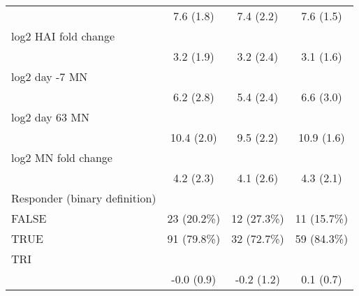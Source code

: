 \begin{table}[]
\begin{tabular}{ l c c c }
 \hspace{6pt}   & 7.6 (1.8) & 7.4 (2.2) & 7.6 (1.5)\\ 
 log2 HAI fold change  &   &   &  \\ 
 \hspace{6pt}   & 3.2 (1.9) & 3.2 (2.4) & 3.1 (1.6)\\ 
 log2 day -7 MN  &   &   &  \\ 
 \hspace{6pt}   & 6.2 (2.8) & 5.4 (2.4) & 6.6 (3.0)\\ 
 log2 day 63 MN  &   &   &  \\ 
 \hspace{6pt}   & 10.4 (2.0) & 9.5 (2.2) & 10.9 (1.6)\\ 
 log2 MN fold change  &   &   &  \\ 
 \hspace{6pt}   & 4.2 (2.3) & 4.1 (2.6) & 4.3 (2.1)\\ 
 Responder (binary definition) &   &   &  \\ 
 \hspace{6pt}    FALSE & 23 (20.2\%) & 12 (27.3\%) & 11 (15.7\%)\\ 
 \hspace{6pt}    TRUE & 91 (79.8\%) & 32 (72.7\%) & 59 (84.3\%)\\ 
 TRI &   &   &  \\ 
 \hspace{6pt}   & -0.0 (0.9) & -0.2 (1.2) & 0.1 (0.7)\\ 
 \bottomrule
 
 \end{tabular}
 \end{table}
